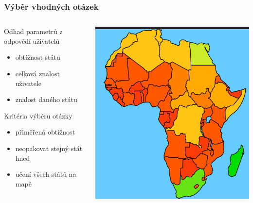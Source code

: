 \documentclass[xcolor=svgnames]{beamer}
\begin{document}
\begin{frame}
	\frametitle{Výběr vhodných otázek}
  \begin{columns}
   \begin{column}{.49\textwidth}
      Odhad parametrů z odpovědí uživatelů 
      \begin{itemize}
        \item obtížnost státu
        \item celková znalost uživatele
        \item znalost daného státu 
      \end{itemize}
      Kritéria výběru otázky 
      \begin{itemize}
        \item přiměřená obtížnost 
        \item neopakovat stejný stát hned
        \item učení všech států na mapě 
      \end{itemize}
    \end{column}
    \begin{column}{.49\textwidth}
       \includegraphics[width=\textwidth]{img/knowledge-map.png}
    \end{column}
  \end{columns}
\end{frame}
\end{document}
